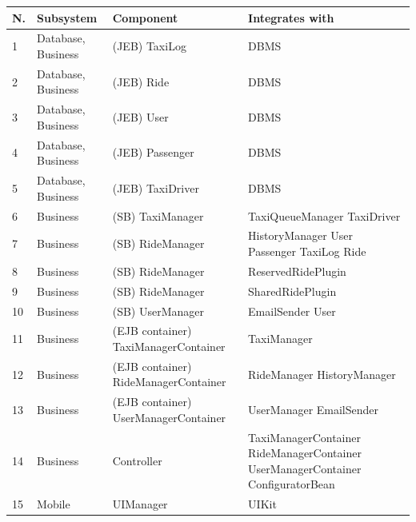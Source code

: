 \begin{table}
    \centering
    \begin{small}
    \begin{tabular}{| l | l | p{} | p{} |}
    \hline
    \textbf{N.} & \textbf{Subsystem} & \textbf{Component} & \textbf{Integrates with} \\
    \hline
    1 & Database, Business & (JEB) TaxiLog & DBMS\\
    \hline
    2 & Database, Business & (JEB)  Ride & DBMS\\
    \hline
    3 & Database, Business & (JEB) User & DBMS\\
    \hline
    4 & Database, Business & (JEB) Passenger & DBMS\\
    \hline
    5 & Database, Business & (JEB) TaxiDriver & DBMS\\
    \hline
    6 & Business & (SB) TaxiManager & TaxiQueueManager \newline TaxiDriver\\
    \hline
    7 & Business & (SB) RideManager & HistoryManager \newline User \newline Passenger \newline TaxiLog \newline Ride\\
    \hline
    8 & Business & (SB) RideManager & ReservedRidePlugin\\
    \hline
    9 & Business & (SB) RideManager & SharedRidePlugin\\
    \hline
    10  & Business & (SB) UserManager & EmailSender \newline User\\
    \hline
    11  & Business & (EJB container) TaxiManagerContainer & TaxiManager\\
    \hline
    12  & Business & (EJB container) RideManagerContainer & RideManager \newline HistoryManager\\
    \hline
    13  & Business & (EJB container) UserManagerContainer & UserManager \newline EmailSender\\
    \hline
    14  & Business & Controller & TaxiManagerContainer \newline RideManagerContainer \newline UserManagerContainer \newline ConfiguratorBean\\
    \hline
    15  & Mobile & UIManager & UIKit\\

\end{tabular}
\end{small}
\end{table}
